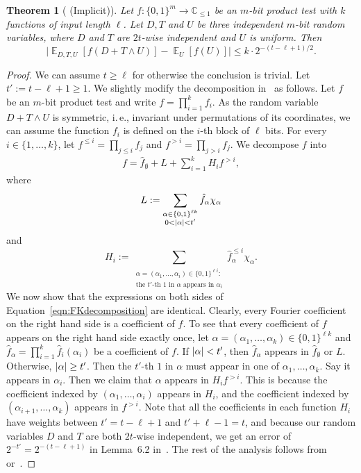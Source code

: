 \documentclass[11pt]{article}
\numberwithin{equation}{section}
\newtheorem{theorem}{Theorem}[section]
\theoremstyle{definition}
\theoremstyle{plain}
\newcommand{\C}{\mathbb C}
\newcommand{\ie}{i.\,e.}
\newcommand{\zo}{\{0,1\}}
\def\Blocklength{\ell}
\def\hf{\hat f}
\DeclarePairedDelimiter{\abs}{\lvert}{\rvert}
\DeclareMathOperator*{\E}{\mathbb{E}}                 %
\begin{document}
  \begin{theorem}[\cite{ForbesK18} (Implicit)] \label{thm:ForbesK}
    Let $f\colon \zo^m \to \C_{\le 1}$ be an %
    $m$-bit  %
    product test with $k$ functions of input length $\Blocklength$.
    Let $D,T$ and $U$ be three independent $m$-bit random variables, where $D$ and $T$ are $2t$-wise independent and $U$ is uniform.  %
    Then
    \[
      \Big| \E_{D,T,U}[f(D + T \wedge U)] - \E_U[f(U)] \Big| \le k \cdot 2^{-(t-\Blocklength+1)/2} .
    \]
  \end{theorem}
  \begin{proof}
   We can assume $t \ge \Blocklength$ for otherwise the conclusion is trivial.
   Let $t' := t - \Blocklength + 1 \ge 1$.
   We slightly modify the decomposition in~\cite[Proposition~6.1]{ForbesK18} as follows.
   Let $f$ be an %
   $m$-bit  %
   product test and write $f = \prod_{i=1}^k f_i$.
   As the random variable $D + T \wedge U$ is symmetric, \ie, invariant under
 permutations of its coordinates, %
we can assume the function $f_i$ is defined on the $i$-th block of $\Blocklength$ bits.
   For every $i \in \{1, \ldots, k\}$, let $f^{\le i} = \prod_{j \le i} f_j$ and $f^{>i} = \prod_{j > i} f_j$.
   We decompose $f$ into
    \begin{align}
      f = \hf_{\emptyset} + L + \sum_{i=1}^k H_i f^{> i} , \label{eqn:FKdecomposition}
    \end{align}
    where
    \[
      L := \sum_{\substack{\alpha \in \zo^{\Blocklength k} \\ 0 < \abs{\alpha} < t'}} \hf_{\alpha} \chi_{\alpha}
    \]
    and
    \[
      H_i := \sum_{\substack{\alpha = (\alpha_1, \ldots, \alpha_i) \in \zo^{\Blocklength i} : \\ 
      \text{the $t'$-th $1$ in $\alpha$ appears in $\alpha_i$} }} \hf^{\le i}_{\alpha} \chi_{\alpha} . 
    \]
		We now show that the expressions on both sides of Equation~\eqref{eqn:FKdecomposition} are identical.
		Clearly, every Fourier coefficient on the right hand side is a coefficient of $f$.
    To see that every coefficient of $f$ appears on the right hand side exactly once, let $\alpha = (\alpha_1, \dots, \alpha_k) \in \zo^{\Blocklength k}$ and $\hf_\alpha = \prod_{i=1}^k \hf_i(\alpha_i)$ be a coefficient of $f$.
    If $\abs{\alpha} < t'$, then $\hf_\alpha$ appears in $\hf_\emptyset$ or $L$.
    Otherwise, $\abs{\alpha} \ge t'$.
    Then the $t'$-th $1$ in $\alpha$ must appear in one of $\alpha_1, \ldots, \alpha_k$.
    Say it appears in $\alpha_i$.
    Then we claim that $\alpha$ appears in $H_i f^{>i}$.
    This is because the coefficient indexed by $(\alpha_1, \ldots, \alpha_i)$ appears in $H_i$,
    and the coefficient indexed by $(\alpha_{i+1}, \ldots, \alpha_k)$ appears in $f^{>i}$.
    Note that all the coefficients in each function $H_i$ have weights between $t' = t-\Blocklength+1$ and $t'+\Blocklength-1 = t$,
    and because our random variables $D$ and $T$ are both $2t$-wise independent, we get an error of $2^{-t'} = 2^{-(t-\Blocklength+1)}$ in Lemma~6.2 in~\cite{ForbesK18}.
    The rest of the analysis follows from~\cite{ForbesK18} or~\cite{HaramatyLV-bipnfp}.
\end{proof}
\end{document}
